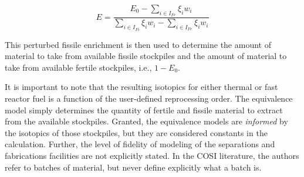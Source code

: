 \begin{equation*}
E = \frac{E_0 - \sum_{i \in I_{Fe}} \xi_i w_i}
         {\sum_{i \in I_{Fi}} \xi_i w_i - \sum_{i \in I_{Fe}} \xi_i w_i}
\end{equation*}

This perturbed fissile enrichment is then used to determine the amount of
material to take from available fissile stockpiles and the amount of material to
take from available fertile stockpiles, i.e., $1 - E_0$.

It is important to note that the resulting isotopics for either thermal or fast
reactor fuel is a function of the user-defined reprocessing order. The
equivalence model simply determines the quantity of fertile and fissile material
to extract from the available stockpiles. Granted, the equivalence models
are \textit{informed} by the isotopics of those stockpiles, but they are
considered constants in the calculation. Further, the level of fidelity of
modeling of the separations and fabrications facilities are not explicitly
stated. In the COSI literature, the authors refer to batches of material, but
never define explicitly what a batch is. 
